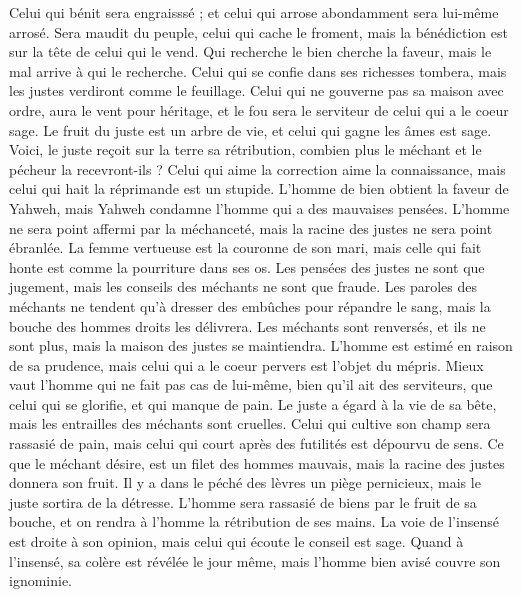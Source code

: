 \begin{multicols}{2}
Celui qui bénit sera engraisssé ; et celui qui arrose abondamment sera lui-même arrosé.
Sera maudit du peuple, celui qui cache le froment, mais la bénédiction est sur la tête de celui qui le vend.
Qui recherche le bien cherche la faveur, mais le mal arrive à qui le recherche.
Celui qui se confie dans ses richesses tombera, mais les justes verdiront comme le feuillage.
Celui qui ne gouverne pas sa maison avec ordre, aura le vent pour héritage, et le fou sera le serviteur de celui qui a le coeur sage.
Le fruit du juste est un arbre de vie, et celui qui gagne les âmes est sage.
Voici, le juste reçoit sur la terre sa rétribution, combien plus le méchant et le pécheur la recevront-ils ?
\VerseOne{}Celui qui aime la correction aime la connaissance, mais celui qui hait la réprimande est un stupide.
L'homme de bien obtient la faveur de Yahweh, mais Yahweh condamne l'homme qui a des mauvaises pensées.
L'homme ne sera point affermi par la méchanceté, mais la racine des justes ne sera point ébranlée.
La femme vertueuse est la couronne de son mari, mais celle qui fait honte est comme la pourriture dans ses os.
Les pensées des justes ne sont que jugement, mais les conseils des méchants ne sont que fraude.
Les paroles des méchants ne tendent qu'à dresser des embûches pour répandre le sang, mais la bouche des hommes droits les délivrera.
Les méchants sont renversés, et ils ne sont plus, mais la maison des justes se maintiendra.
L'homme est estimé en raison de sa prudence, mais celui qui a le coeur pervers est l'objet du mépris.
Mieux vaut l'homme qui ne fait pas cas de lui-même, bien qu'il ait des serviteurs, que celui qui se glorifie, et qui manque de pain.
Le juste a égard à la vie de sa bête, mais les entrailles des méchants sont cruelles.
Celui qui cultive son champ sera rassasié de pain, mais celui qui court après des futilités est dépourvu de sens.
Ce que le méchant désire, est un filet des hommes mauvais, mais la racine des justes donnera son fruit.
Il y a dans le péché des lèvres un piège pernicieux, mais le juste sortira de la détresse.
L'homme sera rassasié de biens par le fruit de sa bouche, et on rendra à l'homme la rétribution de ses mains.
La voie de l'insensé est droite à son opinion, mais celui qui écoute le conseil est sage.
Quand à l'insensé, sa colère est révélée le jour même, mais l'homme bien avisé couvre son ignominie.

\end{multicols}

